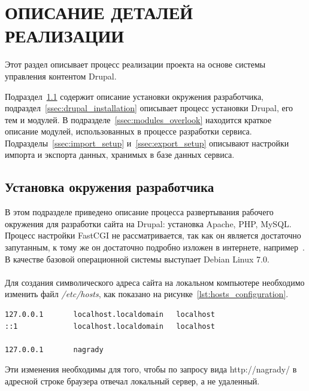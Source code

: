 \section[Описание деталей реализации]{ОПИСАНИЕ ДЕТАЛЕЙ РЕАЛИЗАЦИИ}
\label{sec:realization}

Этот раздел описывает процесс реализации проекта на основе
системы управления контентом Drupal.

Подраздел~\ref{ssec:dev_installation} содержит описание
установки окружения разработчика,
подраздел~\ref{ssec:drupal_installation} описывает процесс
установки Drupal, его тем и модулей.
В подразделе~\ref{ssec:modules_overlook} находится краткое описание модулей,
использованных в процессе разработки сервиса.
Подразделы~\ref{ssec:import_setup} и~\ref{ssec:export_setup} описывают настройки 
импорта и экспорта данных, хранимых в базе данных сервиса.

\subsection{Установка окружения разработчика}
\label{ssec:dev_installation}

В этом подразделе приведено описание процесса развертывания рабочего окружения 
для разработки сайта на Drupal: установка Apache, PHP, MySQL.
Процесс настройки FastCGI не рассматривается, так как он является
достаточно запутанным, к тому же он достаточно подробно изложен в
интернете, например~\cite{fast_cgi_conf}.
В качестве базовой операционной системы выступает Debian Linux 7.0. 

\paragraph{}
Для создания символического адреса сайта на локальном компьютере
необходимо изменить файл \textit{/etc/hosts}, как показано на рисунке~\ref{lst:hosts_configuration}.

\begin{lstlisting}[language=bash,
  caption=Содержимое файла \textit{/etc/hosts},
  label=lst:hosts_configuration]
127.0.0.1       localhost.localdomain   localhost
::1             localhost.localdomain   localhost

127.0.0.1       nagrady
\end{lstlisting}

Эти изменения необходимы для того, чтобы по запросу вида http://nagrady/
в адресной строке браузера отвечал локальный сервер, а не удаленный.

